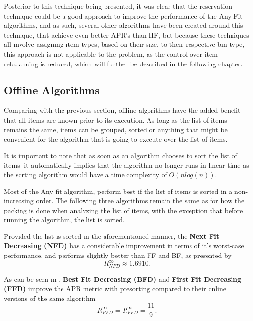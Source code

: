 Posterior to this technique being presented, it was clear that the reservation
technique could be a good approach to improve the performance of the Any-Fit
algorithms, and as such, several other algorithms have been created around this
technique, that achieve even better APR's than HF, but because these techniques
all involve assigning item types, based on their size, to their respective bin
type, this approach is not applicable to the problem, as the control over item
rebalancing is reduced, which will further be described in the following
chapter.

\subsection{Offline Algorithms}

Comparing with the previous section, offline algorithms have the added benefit
that all items are known prior to its execution. As long as the list of items
remains the same, items can be grouped, sorted or anything that might be
convenient for the algorithm that is going to execute over the list of items. 

It is important to note that as soon as an algorithm chooses to sort the list of
items, it automatically implies that the algorithm no longer runs in linear-time
as the sorting algorithm would have a time complexity of $O(n log(n))$.

Most of the Any fit algorithm, perform best if the list of items is sorted in a
non-increasing order. The following three algorithms remain the same as for how
the packing is done when analyzing the list of items, with the exception that
before running the algorithm, the list is sorted.

Provided the list is sorted in the aforementioned manner, the \textbf{Next Fit
Decreasing (NFD)} has a considerable improvement in terms of it's worst-case
performance, and performs slightly better than FF and BF, as presented by
\cite{baker1981tight}
\begin{equation}
    R_{NFD}^\infty \approx 1.6910.
\end{equation}

As can be seen in \cite{johnson1974worst}, \textbf{Best Fit Decreasing (BFD)}
and \textbf{First Fit Decreasing (FFD)} improve the APR metric with presorting
compared to their online versions of the same algorithm 
\begin{equation}
    R_{BFD}^\infty = R_{FFD}^\infty = \frac{11}{9}.
\end{equation}

